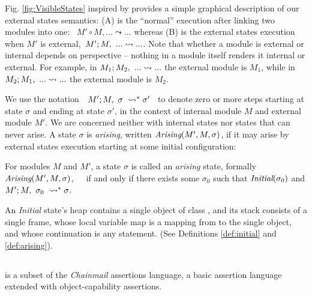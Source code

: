Fig. \ref{fig:VisibleStates} inspired by  provides a simple graphical description of 
our external states semantics: (A) is the ``normal'' execution after 
linking two modules into one: \ $M' \circ M, ... \leadsto ...$ whereas (B) is the
 external states execution when $M'$ is external,\   $M' ; M,\ ... \leadsto ...$.
Note that whether a module is external or internal depends on %
perspective -- nothing in a module itself renders it internal or external. For example, in
 $M_1 ; M_2,\ ... \leadsto ...$ the external module is $M_1$,
  while in  $M_2 ; M_1,\ ... \leadsto ...$  the external module is $M_2$.

We  use the notation\ \  $M' ; M,\ \sigma\ \leadsto^* \sigma'$ \ 
to denote zero or more  steps starting at state $\sigma$ and ending at state $\sigma'$, in the context of internal module 
$M$ and external module $M'$.
We are concerned neither with internal states nor states that can never arise.
{A state $\sigma$ is \emph{arising},}  written $\textit{Arising}(M', M, \sigma)$, {if it  may arise by external states} execution
starting at some initial configuration:



\begin{definition}
\label{def:arising}
For   modules $M$ and  $M'$, a %
 state $\sigma$ is 
called an \emph{arising} state, formally \ \ \ $\textit{Arising}(M', M, \sigma)$,\ \ \ 
if and only if there exists some $\sigma_0$ such that $\textit{Initial}(\sigma_0)$ and
$M' ; M,\ \sigma_0\ \leadsto^* \sigma$.
\end{definition}

An \emph{Initial} state's heap
contains a single object of class , and
its  stack   consists of a single frame, whose local variable map is a
mapping from \prg{this} to the single object, and whose continuation is  any statement.
(See Definitions \ref{def:initial} and \ref{def:arising}).


\subsection{\SpecO}
\label{sub:SpecO}

\SpecO is a subset of the \emph{Chainmail} assertions language, \ie
a basic assertion language extended with
object-capability assertions. 


